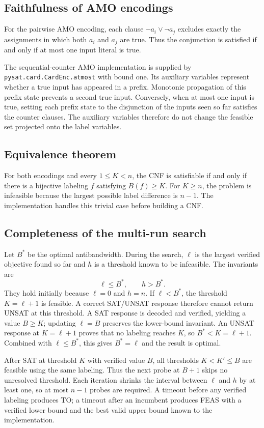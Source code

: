 \subsection{Faithfulness of AMO encodings}
For the pairwise AMO encoding, each clause
$\neg a_i\vee\neg a_j$ excludes exactly the assignments in which both
$a_i$ and $a_j$ are true. Thus the conjunction is satisfied if and only if
at most one input literal is true.

The sequential-counter AMO implementation is supplied by
\texttt{pysat.card.CardEnc.atmost} with bound one. Its auxiliary variables
represent whether a true input has appeared in a prefix. Monotonic propagation
of this prefix state prevents a second true input. Conversely, when at most
one input is true, setting each prefix state to the disjunction of the inputs
seen so far satisfies the counter clauses. The auxiliary variables therefore
do not change the feasible set projected onto the label variables.

\subsection{Equivalence theorem}
For both encodings and every $1\leq K<n$, the CNF is satisfiable if and only
if there is a bijective labeling $f$ satisfying $B(f)\geq K$. For $K\geq n$,
the problem is infeasible because the largest possible label difference is
$n-1$. The implementation handles this trivial case before building a CNF.

\subsection{Completeness of the multi-run search}
Let $B^*$ be the optimal antibandwidth. During the search, $\ell$ is the
largest verified objective found so far and $h$ is a threshold known to be
infeasible. The invariants are
\[
  \ell\leq B^*, \qquad h>B^*.
\]
They hold initially because $\ell=0$ and $h=n$. If $\ell<B^*$, the threshold
$K=\ell+1$ is feasible. A correct SAT/UNSAT response therefore cannot return
UNSAT at this threshold. A SAT response is decoded and verified, yielding a
value $B\geq K$; updating $\ell=B$ preserves the lower-bound invariant. An
UNSAT response at $K=\ell+1$ proves that no labeling reaches $K$, so
$B^*<K=\ell+1$. Combined with $\ell\leq B^*$, this gives
$B^*=\ell$ and the result is optimal.

After SAT at threshold $K$ with verified value $B$, all thresholds
$K<K'\leq B$ are feasible using the same labeling. Thus the next probe at
$B+1$ skips no unresolved threshold. Each iteration shrinks the interval
between $\ell$ and $h$ by at least one, so at most $n-1$ probes are required.
A timeout before any verified labeling produces TO; a timeout after an
incumbent produces FEAS with a verified lower bound and the best valid upper
bound known to the implementation.

